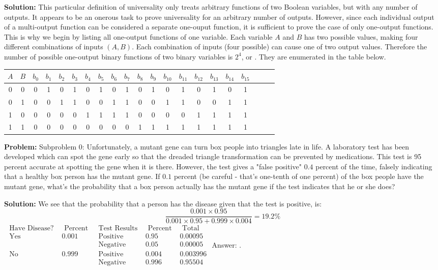 \documentclass[10pt]{article}
\begin{document}
\textbf{Solution:}
This particular definition of universality only treats arbitrary functions of two Boolean variables, but with any number of outputs. It appears to be an onerous task to prove universality for an arbitrary number of outputs. However, since each individual output of a multi-output function can be considered a separate one-ouput function, it is sufficient to prove the case of only one-output functions. This is why we begin by listing all one-output functions of one variable.
Each variable $A$ and $B$ has two possible values, making four different combinations of inputs $(A, B)$. Each combination of inputs (four possible) can cause one of two output values. Therefore the number of possible one-output binary functions of two binary variables is $2^{4}$, or . They are enumerated in the table below.
\begin{tabular}{cc|ccccccccccccccccccc}
$A$ & $B$ & $b_{0}$ & $b_{1}$ & $b_{2}$ & $b_{3}$ & $b_{4}$ & $b_{5}$ & $b_{6}$ & $b_{7}$ & $b_{8}$ & $b_{9}$ & $b_{10}$ & $b_{11}$ & $b_{12}$ & $b_{13}$ & $b_{14}$ & $b_{15}$ &  \\
\hline
0 & 0 & 0 & 1 & 0 & 1 & 0 & 1 & 0 & 1 & 0 & 1 & 0 & 1 & 0 & 1 & 0 & 1 &  \\
0 & 1 & 0 & 0 & 1 & 1 & 0 & 0 & 1 & 1 & 0 & 0 & 1 & 1 & 0 & 0 & 1 & 1 &  \\
1 & 0 & 0 & 0 & 0 & 0 & 1 & 1 & 1 & 1 & 0 & 0 & 0 & 0 & 1 & 1 & 1 & 1 &  \\
1 & 1 & 0 & 0 & 0 & 0 & 0 & 0 & 0 & 0 & 1 & 1 & 1 & 1 & 1 & 1 & 1 & 1 &  \\
\end{tabular}


\textbf{Problem:}
Subproblem 0: Unfortunately, a mutant gene can turn box people into triangles late in life. A laboratory test has been developed which can spot the gene early so that the dreaded triangle transformation can be prevented by medications. This test is 95 percent accurate at spotting the gene when it is there. However, the test gives a "false positive" $0.4$ percent of the time, falsely indicating that a healthy box person has the mutant gene. If $0.1$ percent (be careful - that's one-tenth of one percent) of the box people have the mutant gene, what's the probability that a box person actually has the mutant gene if the test indicates that he or she does?


\textbf{Solution:}
We see that the probability that a person has the disease given that the test is positive, is:
\[
\frac{0.001 \times 0.95}{0.001 \times 0.95+0.999 \times 0.004}=19.2 \%
\]
$\begin{array}{ccccc}\text { Have Disease? } & \text { Percent } & \text { Test Results } & \text { Percent } & \text { Total } \\ \text { Yes } & 0.001 & \text { Positive } & 0.95 & 0.00095 \\ & & \text { Negative } & 0.05 & 0.00005 \\ \text { No } & 0.999 & \text { Positive } & 0.004 & 0.003996 \\ & & \text { Negative } & 0.996 & 0.95504\end{array}$
Answer: .
\end{document}
